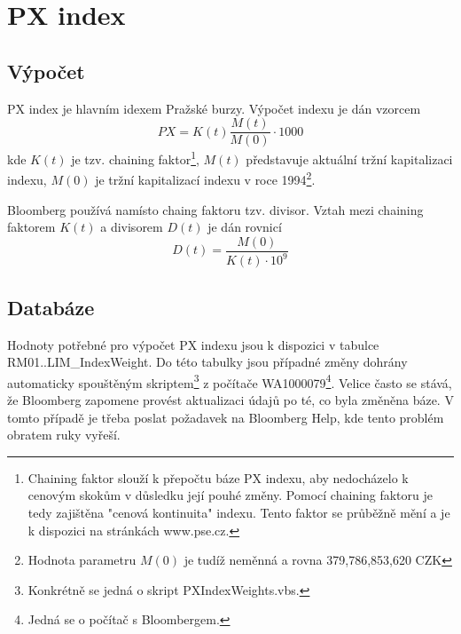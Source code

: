 \documentclass[a4paper]{book}
\begin{document}
\chapter{PX index}

\section{Výpočet}

PX index je hlavním idexem Pražské burzy. Výpočet indexu je dán vzorcem
\begin{equation*}
PX = K(t)\frac{M(t)}{M(0)} \cdot 1000
\end{equation*}
kde $K(t)$ je tzv. chaining faktor\footnote{Chaining faktor slouží k přepočtu báze PX indexu, aby nedocházelo k cenovým skokům v důsledku její pouhé změny. Pomocí chaining faktoru je tedy zajištěna "cenová kontinuita" indexu. Tento faktor se průběžně mění a je k dispozici na stránkách www.pse.cz.}, $M(t)$ představuje aktuální tržní kapitalizaci indexu, $M(0)$ je tržní kapitalizací indexu v roce 1994\footnote{Hodnota parametru $M(0)$ je tudíž neměnná a rovna 379,786,853,620 CZK}.

Bloomberg používá namísto chaing faktoru tzv. divisor. Vztah mezi chaining faktorem $K(t)$ a divisorem $D(t)$ je dán rovnicí
\begin{equation*}
D(t) = \frac{M(0)}{K(t) \cdot 10^9}
\end{equation*}

\section{Databáze}
Hodnoty potřebné pro výpočet PX indexu jsou k dispozici v tabulce RM01..LIM\_IndexWeight. Do této tabulky jsou případné změny dohrány automaticky spouštěným skriptem\footnote{Konkrétně se jedná o skript PXIndexWeights.vbs.} z počítače WA1000079\footnote{Jedná se o počítač s Bloombergem.}. Velice často se stává, že Bloomberg zapomene provést aktualizaci údajů po té, co byla změněna báze. V tomto případě je třeba poslat požadavek na Bloomberg Help, kde tento problém obratem ruky vyřeší.
\end{document}
